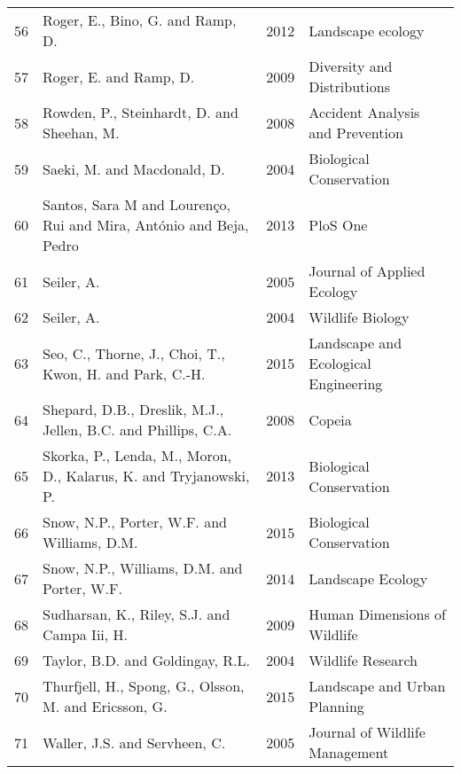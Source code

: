 \begin{table}[htp]
\begin{tabularx}{0.9\textwidth}{lYll}
   56 & Roger, E., Bino, G. and Ramp, D. & 2012 & Landscape ecology \\ 
   57 & Roger, E. and Ramp, D. & 2009 & Diversity and Distributions \\ 
   58 & Rowden, P., Steinhardt, D. and Sheehan, M. & 2008 & Accident Analysis and Prevention  \\ 
   59 & Saeki, M. and Macdonald, D. & 2004 & Biological Conservation  \\ 
   60 & Santos, Sara M and Louren{\c{c}}o, Rui and Mira, Ant{\'o}nio and Beja, Pedro & 2013 & PloS One \\ 
   61 & Seiler, A. & 2005 & Journal of Applied Ecology \\ 
   62 & Seiler, A. & 2004 & Wildlife Biology \\ 
   63 & Seo, C., Thorne, J., Choi, T., Kwon, H. and Park, C.-H. & 2015 & Landscape and Ecological Engineering \\ 
   64 & Shepard, D.B., Dreslik, M.J., Jellen, B.C. and Phillips, C.A. & 2008 & Copeia \\ 
   65 & Skorka, P., Lenda, M., Moron, D., Kalarus, K. and Tryjanowski, P. & 2013 & Biological Conservation  \\ 
   66 & Snow, N.P., Porter, W.F. and Williams, D.M. & 2015 & Biological Conservation  \\ 
   67 & Snow, N.P., Williams, D.M. and Porter, W.F. & 2014 & Landscape Ecology \\ 
   68 & Sudharsan, K., Riley, S.J. and Campa Iii, H. & 2009 & Human Dimensions of Wildlife \\ 
   69 & Taylor, B.D. and Goldingay, R.L. & 2004 & Wildlife Research \\ 
   70 & Thurfjell, H., Spong, G., Olsson, M. and Ericsson, G. & 2015 & Landscape and Urban Planning  \\ 
   71 & Waller, J.S. and Servheen, C. & 2005 & Journal of Wildlife Management \\ 
   \hline
\end{tabularx}
\label{studies}
\end{table}

